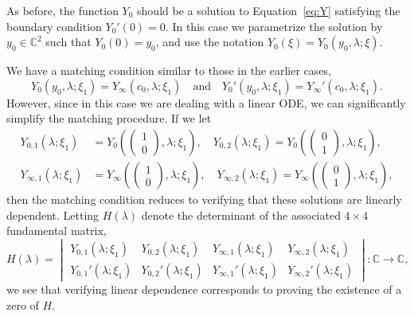 \documentclass[11pt]{article}
\begin{document}
As before, the function \(Y_{0}\) should be a solution to
Equation~\eqref{eq:Y} satisfying the boundary condition
\(Y_{0}'(0) = 0\). In this case we parametrize the solution by
\(y_{0} \in \mathbb{C}^{2}\) such that \(Y_{0}(0) = y_{0}\), and use
the notation \(Y_{0}(\xi) = Y_{0}(y_{0}, \lambda; \xi)\).

We have a matching condition similar to those in the earlier cases,
\begin{equation}\label{eq:Y-match}
  Y_{0}(y_{0}, \lambda; \xi_{1}) = Y_{\infty}(c_{0}, \lambda; \xi_{1})
  \quad\text{and}\quad
  Y_{0}'(y_{0}, \lambda; \xi_{1}) = Y_{\infty}'(c_{0}, \lambda; \xi_{1}).
\end{equation}
However, since in this case we are dealing with a linear ODE, we can
significantly simplify the matching procedure. If we let
\begin{align*}
  Y_{0,1}(\lambda; \xi_{1}) &= Y_{0}\left(\begin{pmatrix} 1 \\ 0 \end{pmatrix}, \lambda; \xi_{1}\right),\quad
  Y_{0,2}(\lambda; \xi_{1}) = Y_{0}\left(\begin{pmatrix} 0 \\ 1 \end{pmatrix}, \lambda; \xi_{1}\right),\\
  Y_{\infty,1}(\lambda; \xi_{1}) &= Y_{\infty}\left(\begin{pmatrix} 1 \\ 0 \end{pmatrix}, \lambda; \xi_{1}\right),\quad
  Y_{\infty,2}(\lambda; \xi_{1}) = Y_{\infty}\left(\begin{pmatrix} 0 \\ 1 \end{pmatrix}, \lambda; \xi_{1}\right),
\end{align*}
then the matching condition reduces to verifying that these solutions
are linearly dependent. Letting \(H(\lambda)\) denote the
determinant of the associated \(4 \times 4\) fundamental matrix,
\begin{equation}\label{eq:H}
  H(\lambda) =
  \begin{vmatrix}
    Y_{0,1}(\lambda; \xi_{1}) & Y_{0,2}(\lambda; \xi_{1}) & Y_{\infty,1}(\lambda; \xi_{1}) & Y_{\infty,2}(\lambda; \xi_{1}) \\
    Y_{0,1}'(\lambda; \xi_{1}) & Y_{0,2}'(\lambda; \xi_{1}) & Y_{\infty,1}'(\lambda; \xi_{1}) & Y_{\infty,2}'(\lambda; \xi_{1})
  \end{vmatrix} \colon \mathbb{C} \to \mathbb{C},
\end{equation}
we see that verifying linear dependence corresponds to proving the
existence of a zero of \(H\).
\end{document}
